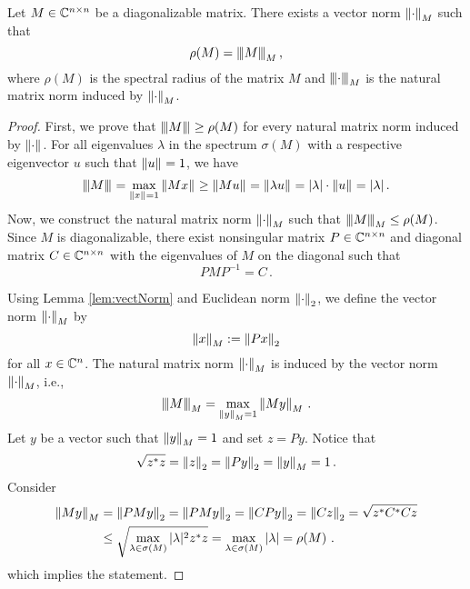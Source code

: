 \begin{theo}
\label{thm:norm}
Let $M\in\CC^{n\times n}$ be a diagonalizable matrix. There exists a vector norm $\norm{\cdot}{M}$ such that 
$$
\rho(M)=\Mnorm{M}{M}\,,
$$
where $\rho(M)$ is the spectral radius of the matrix $M$ and $\Mnorm{\cdot}{M}$ is the natural matrix norm induced by $\norm{\cdot}{M}$.
\end{theo}
\begin{proof}
First, we prove that $\Mnorm{M}{}\geq\rho(M)$ for every natural matrix norm induced by $\norm{\cdot}{}$. For all eigenvalues $\lambda$ in the spectrum $\sigma(M)$ with a respective eigenvector $u$ such that $\norm{u}{}=1$, we have
$$
\Mnorm{M}{}=\max_{\norm{x}{}=1} \norm{Mx}{}\geq \norm{Mu}{}=\norm{\lambda u}{}=|\lambda|\cdot\norm{u}{}=|\lambda|\,.
$$
Now, we construct the natural matrix norm $\norm{\cdot}{M}$ such that $\Mnorm{M}{M}\leq\rho(M)$. Since $M$ is diagonalizable, there exist nonsingular matrix $P\in\CC^{n\times n}$ and diagonal matrix $C\in\CC^{n\times n}$ with the eigenvalues of $M$ on the diagonal such that 
$$
PMP^{-1}=C\,.
$$ 

Using Lemma \ref{lem:vectNorm} and Euclidean norm $\norm{\cdot}{2}$, we define the vector norm $\norm{\cdot}{M}$ by 
\begin{equation}
\norm{x}{M}:=\norm{Px}{2}
\end{equation}
for all $x\in\CC^n$. The natural matrix norm $\norm{\cdot}{M}$ is induced by the vector norm $\norm{\cdot}{M}$, i.e.,
$$
\Mnorm{M}{M}=\max_{\norm{y}{M}=1} \norm{My}{M}\,.
$$
Let $y$ be a  vector such that $\norm{y}{M}=1$ and set $z=Py$. Notice that 
$$
\sqrt{z^*z}=\norm{z}{2}=\norm{Py}{2}=\norm{y}{M}=1\,.
$$
Consider
\begin{align*}
\norm{My}{M}&=\norm{PMy}{2}=\norm{PMy}{2}=\norm{CPy}{2}=\norm{Cz}{2}=\sqrt{z^*C^*Cz}\\
    &\leq \sqrt{\max_{\lambda\in\sigma(M)}|\lambda|^2 z^*z}=\max_{\lambda\in\sigma(M)}|\lambda|=\rho(M)\,\,.
\end{align*}
which implies the statement.
\end{proof}

